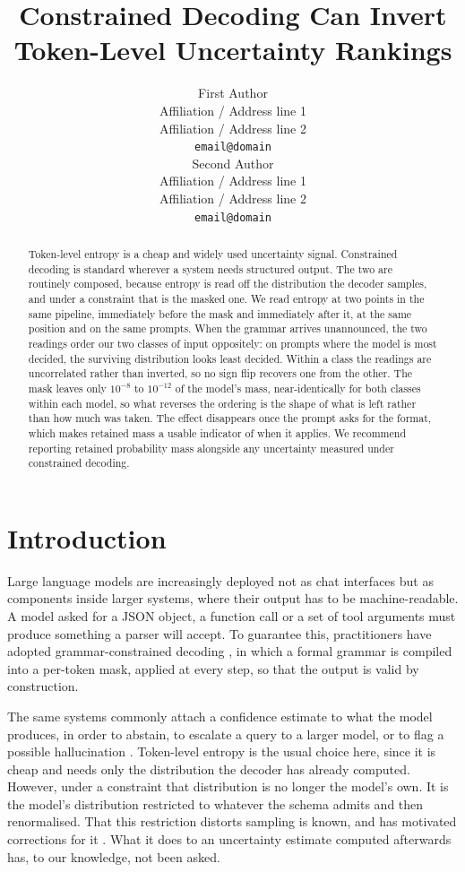 \documentclass[11pt]{article}
\title{Constrained Decoding Can Invert Token-Level Uncertainty Rankings}
\author{First Author \\
  Affiliation / Address line 1 \\
  Affiliation / Address line 2 \\
  \texttt{email@domain} \\\And
  Second Author \\
  Affiliation / Address line 1 \\
  Affiliation / Address line 2 \\
  \texttt{email@domain} \\}
\begin{document}
\maketitle

\begin{abstract}
Token-level entropy is a cheap and widely used uncertainty signal. Constrained
decoding is standard wherever a system needs structured output. The two are
routinely composed, because entropy is read off the distribution the decoder
samples, and under a constraint that is the masked one. We read entropy at two
points in the same pipeline, immediately before the mask and immediately after
it, at the same position and on the same prompts. When the grammar arrives
unannounced, the two readings order our two classes of input oppositely: on
prompts where the model is most decided, the surviving distribution looks least
decided. Within a class the readings are uncorrelated rather than inverted, so no
sign flip recovers one from the other. The mask leaves only $10^{-8}$ to
$10^{-12}$ of the model's mass, near-identically for both classes within each
model, so what reverses the ordering is the shape of what is left rather than how
much was taken. The effect disappears once the prompt asks for the
format, which makes retained mass a usable indicator of when it applies. We
recommend reporting retained probability mass alongside any uncertainty measured
under constrained decoding.
\end{abstract}

\section{Introduction}
\label{sec:intro}

Large language models are increasingly deployed not as chat interfaces but as
components inside larger systems, where their output has to be machine-readable.
A model asked for a JSON object, a function call or a set of tool arguments must
produce something a parser will accept. To guarantee this, practitioners have
adopted grammar-constrained decoding
\citep{geng-etal-2023-grammar,willard-louf-2023-efficient,dong-etal-2024-xgrammar},
in which a formal grammar is compiled into a per-token mask, applied at every
step, so that the output is valid by construction.

The same systems commonly attach a confidence estimate to what the model
produces, in order to abstain, to escalate a query to a larger model, or to flag
a possible hallucination
\citep{fadeeva-etal-2024-fact,gupta-etal-2024-cascades}. Token-level entropy is
the usual choice here, since it is cheap and needs only the distribution the
decoder has already computed. However, under a constraint that distribution is no
longer the model's own. It is the model's distribution restricted to whatever the
schema admits and then renormalised. That this restriction distorts sampling is
known, and has motivated corrections for it
\citep{park-etal-2024-grammar,reddy-etal-2026-dccd}. What it does to an
uncertainty estimate computed afterwards has, to our knowledge, not been asked.
\end{document}
